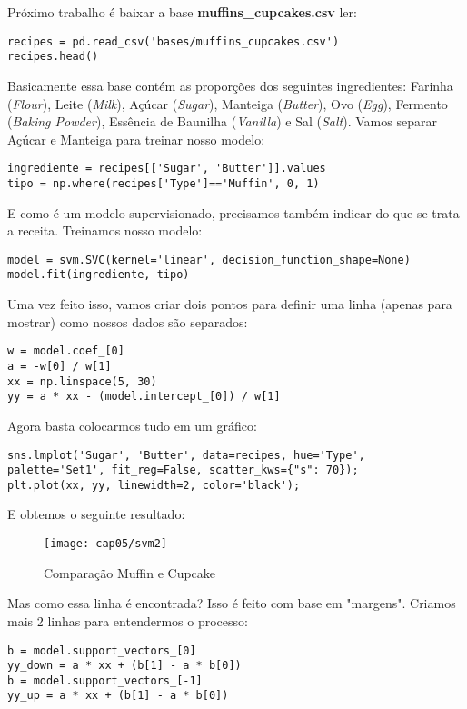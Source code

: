 Próximo trabalho é baixar a base \textbf{muffins\_cupcakes.csv} ler:
\begin{lstlisting}[]
recipes = pd.read_csv('bases/muffins_cupcakes.csv')
recipes.head()
\end{lstlisting}

Basicamente essa base contém as proporções dos seguintes ingredientes: Farinha (\textit{Flour}), Leite (\textit{Milk}), Açúcar (\textit{Sugar}), Manteiga (\textit{Butter}), Ovo (\textit{Egg}), Fermento (\textit{Baking Powder}), Essência de Baunilha (\textit{Vanilla}) e Sal (\textit{Salt}). Vamos separar Açúcar e Manteiga para treinar nosso modelo:
\begin{lstlisting}[]
ingrediente = recipes[['Sugar', 'Butter']].values
tipo = np.where(recipes['Type']=='Muffin', 0, 1)
\end{lstlisting}

E como é um modelo supervisionado, precisamos também indicar do que se trata a receita. Treinamos nosso modelo:
\begin{lstlisting}[]
model = svm.SVC(kernel='linear', decision_function_shape=None)
model.fit(ingrediente, tipo)
\end{lstlisting}

Uma vez feito isso, vamos criar dois pontos para definir uma linha (apenas para mostrar) como nossos dados são separados:
\begin{lstlisting}[]
w = model.coef_[0]
a = -w[0] / w[1]
xx = np.linspace(5, 30)
yy = a * xx - (model.intercept_[0]) / w[1]
\end{lstlisting}

Agora basta colocarmos tudo em um gráfico:
\begin{lstlisting}[]
sns.lmplot('Sugar', 'Butter', data=recipes, hue='Type', palette='Set1', fit_reg=False, scatter_kws={"s": 70});
plt.plot(xx, yy, linewidth=2, color='black');
\end{lstlisting}

E obtemos o seguinte resultado:
\begin{figure}[H]
	\centering
	\texttt{[image: cap05/svm2]}
	\caption{Comparação Muffin e Cupcake}
\end{figure}

Mas como essa linha é encontrada? Isso é feito com base em "margens". Criamos mais 2 linhas para entendermos o processo:
\begin{lstlisting}[]
b = model.support_vectors_[0]
yy_down = a * xx + (b[1] - a * b[0])
b = model.support_vectors_[-1]
yy_up = a * xx + (b[1] - a * b[0])
\end{lstlisting}

